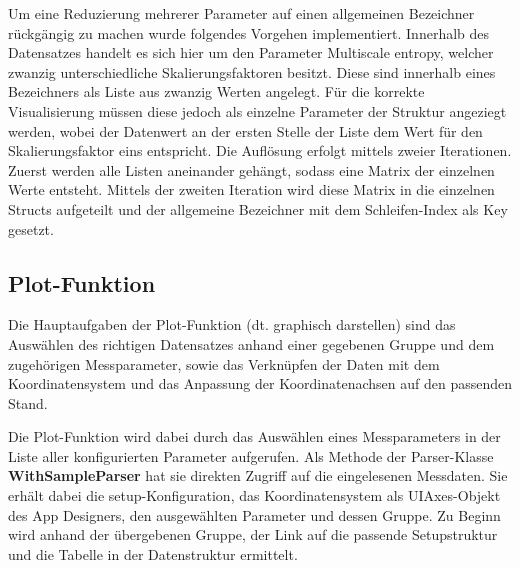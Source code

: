 

Um eine Reduzierung mehrerer Parameter auf einen allgemeinen Bezeichner rückgängig zu machen wurde folgendes Vorgehen implementiert. Innerhalb des Datensatzes handelt es sich hier um den Parameter \glqq Multiscale entropy\grqq{}, welcher zwanzig unterschiedliche Skalierungsfaktoren besitzt. Diese sind innerhalb eines Bezeichners als Liste aus zwanzig Werten angelegt. Für die korrekte Visualisierung müssen diese jedoch als einzelne Parameter der Struktur angeziegt werden, wobei der Datenwert an der ersten Stelle der Liste dem Wert für den Skalierungsfaktor eins entspricht. Die Auflösung erfolgt mittels zweier Iterationen. Zuerst werden alle Listen aneinander gehängt, sodass eine Matrix der einzelnen Werte entsteht. Mittels der zweiten Iteration wird diese Matrix in die einzelnen Structs aufgeteilt und der allgemeine Bezeichner mit dem Schleifen-Index als Key gesetzt.




\subsection{Plot-Funktion}

Die Hauptaufgaben der Plot-Funktion (dt. graphisch darstellen) sind das Auswählen des richtigen Datensatzes anhand einer gegebenen Gruppe und dem zugehörigen Messparameter, sowie das Verknüpfen der Daten mit dem Koordinatensystem und das Anpassung der Koordinatenachsen auf den passenden Stand.

Die Plot-Funktion wird dabei durch das Auswählen eines Messparameters in der Liste aller konfigurierten Parameter aufgerufen. Als Methode der Parser-Klasse \textbf{WithSampleParser} hat sie direkten Zugriff auf die eingelesenen Messdaten. Sie erhält dabei die setup-Konfiguration, das Koordinatensystem als UIAxes-Objekt des App Designers, den ausgewählten Parameter und dessen Gruppe. Zu Beginn wird anhand der übergebenen Gruppe, der Link auf die passende Setupstruktur und die Tabelle in der Datenstruktur ermittelt.



